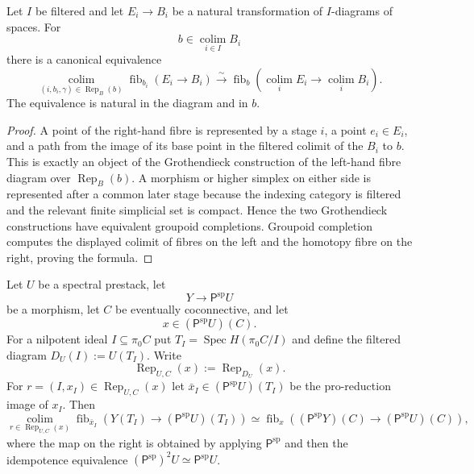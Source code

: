 \begin{lemma}
\label{lem:bnli-pointed-filtered-fibre}
Let $I$ be filtered and let $E_i\to B_i$ be a natural transformation of
$I$-diagrams of spaces.  For
\[
    b\in\operatorname*{colim}_{i\in I}B_i
\]
there is a canonical equivalence
\[
\boxed{
    \operatorname*{colim}_{(i,b_i,\gamma)\in\operatorname{Rep}_B(b)}
    \operatorname{fib}_{b_i}(E_i\to B_i)
    \xrightarrow{\sim}
    \operatorname{fib}_{b}
    \left(
      \operatorname*{colim}_iE_i
      \longrightarrow
      \operatorname*{colim}_iB_i
    \right).}
\]
The equivalence is natural in the diagram and in $b$.
\end{lemma}

\begin{proof}
A point of the right-hand fibre is represented by a stage $i$, a point
$e_i\in E_i$, and a path from the image of its base point in the filtered
colimit of the $B_i$ to $b$.  This is exactly an object of the Grothendieck
construction of the left-hand fibre diagram over
$\operatorname{Rep}_B(b)$.  A morphism or higher simplex on either side is
represented after a common later stage because the indexing category is
filtered and the relevant finite simplicial set is compact.  Hence the two
Grothendieck constructions have equivalent groupoid completions.  Groupoid
completion computes the displayed colimit of fibres on the left and the
homotopy fibre on the right, proving the formula.
\end{proof}

\begin{lemma}
\label{lem:bnli-pointed-prored-fibre}
Let $U$ be a spectral prestack, let
\[
    Y\longrightarrow\mathsf P^{\mathrm{sp}}U
\]
be a morphism, let $C$ be eventually coconnective, and let
\[
    x\in(\mathsf P^{\mathrm{sp}}U)(C).
\]
For a nilpotent ideal $I\subseteq\pi_0C$ put
$T_I=\operatorname{Spec}H(\pi_0C/I)$ and define the filtered diagram
$D_U(I):=U(T_I)$.  Write
\[
    \operatorname{Rep}_{U,C}(x)
    :=
    \operatorname{Rep}_{D_U}(x).
\]
For $r=(I,x_I)\in\operatorname{Rep}_{U,C}(x)$ let
$\bar x_I\in(\mathsf P^{\mathrm{sp}}U)(T_I)$ be the pro-reduction image of
$x_I$.  Then
\[
\boxed{
\operatorname*{colim}_{r\in\operatorname{Rep}_{U,C}(x)}
\operatorname{fib}_{\bar x_I}
\left(
  Y(T_I)\longrightarrow(\mathsf P^{\mathrm{sp}}U)(T_I)
\right)
\simeq
\operatorname{fib}_{x}
\left(
  (\mathsf P^{\mathrm{sp}}Y)(C)
  \longrightarrow
  (\mathsf P^{\mathrm{sp}}U)(C)
\right),}
\]
where the map on the right is obtained by applying
$\mathsf P^{\mathrm{sp}}$ and then the idempotence equivalence
$(\mathsf P^{\mathrm{sp}})^2U\simeq\mathsf P^{\mathrm{sp}}U$.
\end{lemma}

